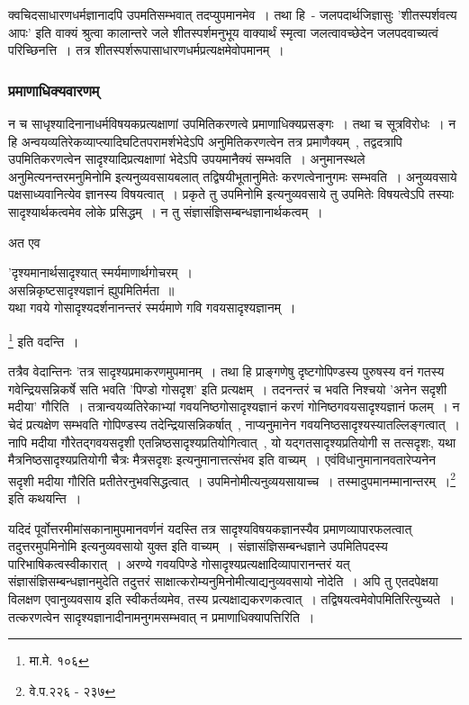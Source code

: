 		क्वचिदसाधारणधर्मज्ञानादपि उपमतिसम्भवात् तदप्युपमानमेव~। तथा हि~- जलपदार्थजिज्ञासुः 'शीतस्पर्शवत्य आपः' इति वाक्यं श्रुत्वा कालान्तरे जले शीतस्पर्शमनुभूय वाक्यार्थं स्मृत्वा जलत्वावच्छेदेन जलपदवाच्यत्वं परिच्छिनत्ति~। तत्र शीतस्पर्शरूपासाधारणधर्मप्रत्यक्षमेवोपमानम्~।

		\subsubsection{प्रमाणाधिक्यवारणम्}

		न च साधृश्यादिनानाधर्मविषयकप्रत्यक्षाणां उपमितिकरणत्वे प्रमाणाधिक्यप्रसङ्गः~। तथा च सूत्रविरोधः~। न हि अन्वयव्यतिरेकव्याप्त्यादिघटितपरामर्शभेदेऽपि अनुमितिकरणत्वेन तत्र प्रमाणैक्यम्~, तद्वदत्रापि उपमितिकरणत्वेन सादृश्यादिप्रत्यक्षाणां भेदेऽपि उपयमानैक्यं सम्भवति~। अनुमानस्थले अनुमित्यनन्तरमनुमिनोमि इत्यनुव्यवसायबलात् तद्विषयीभूतानुमितेः करणत्वेनानुगमः सम्भवति~। अनुव्यवसाये पक्षसाध्यवानित्येव ज्ञानस्य विषयत्वात्~। प्रकृते तु उपमिनोमि इत्यनुव्यवसाये तु उपमितेः विषयत्वेऽपि तस्याः सादृश्यार्थकत्वमेव लोके प्रसिद्धम्~। न तु संज्ञासंज्ञिसम्बन्धज्ञानार्थकत्वम्~। 
		
		अत एव {\fontsize{11.7}{0}\selectfont\s \begin{center}'दृश्यमानार्थसादृश्यात् स्मर्यमाणार्थगोचरम्~।\\ असन्निकृष्टसादृश्यज्ञानं ह्युपमितिर्मता~॥\\ यथा गवये गोसादृश्यदर्शनानन्तरं स्मर्यमाणे गवि गवयसादृश्यज्ञानम्~।\end{center}}\footnote{मा.मे. १०६} इति वदन्ति~। 
		
		तत्रैव वेदान्तिनः {\fontsize{11.7}{0}\selectfont\s 'तत्र सादृश्यप्रमाकरणमुपमानम्~। तथा हि प्राङ्गणेषु दृष्टगोपिण्डस्य पुरुषस्य वनं गतस्य गवेन्द्रियसन्निकर्षे सति भवति 'पिण्डो गोसदृश' इति प्रत्यक्षम्~। तदनन्तरं च भवति निश्चयो 'अनेन सदृशी मदीया' गौरिति~। तत्रान्वयव्यतिरेकाभ्यां गवयनिष्ठगोसादृश्यज्ञानं करणं गोनिष्ठगवयसादृश्यज्ञानं फलम्~। न चेदं प्रत्यक्षेण सम्भवति गोपिण्डस्य तदेन्द्रियासन्निकर्षात्~, नाप्यनुमानेन गवयनिष्ठसादृश्यस्यातल्लिङ्गत्वात्~। नापि मदीया गौरेतद्गवयसदृशी एतन्निष्ठसादृश्यप्रतियोगित्वात्~, यो यद्गतसादृश्यप्रतियोगी स तत्सदृशः, यथा मैत्रनिष्ठसादृश्यप्रतियोगी चैत्रः मैत्रसदृशः इत्यनुमानात्तत्संभव इति वाच्यम्~। एवंविधानुमानानवतारेप्यनेन सदृशी मदीया गौरिति प्रतीतेरनुभवसिद्धत्वात्~। उपमिनोमीत्यनुव्ययसायाच्च~। तस्मादुपमानम्मानान्तरम्~।}\footnote{वे.प.२२६ - २३७} इति कथयन्ति~।
		
		यदिदं पूर्वोत्तरमीमांसकानामुपमानवर्णनं यदस्ति तत्र सादृश्यविषयकज्ञानस्यैव प्रमाणव्यापारफलत्वात् तदुत्तरमुपमिनोमि इत्यनुव्यवसायो युक्त इति वाच्यम्~। संज्ञासंज्ञिसम्बन्धज्ञाने उपमितिपदस्य पारिभाषिकत्वस्वीकारात्~। अरण्ये गवयपिण्डे गोसादृश्यप्रत्यक्षादिव्यापारानन्तरं यत् संज्ञासंज्ञिसम्बन्धज्ञानमुदेति तदुत्तरं साक्षात्करोम्यनुमिनोमीत्याद्यनुव्यवसायो नोदेति~। अपि तु एतदपेक्षया विलक्षण एवानुव्यवसाय इति स्वीकर्तव्यमेव, तस्य प्रत्यक्षाद्यकरणकत्वात्~। तद्विषयत्वमेवोपमितिरित्युच्यते~। तत्करणत्वेन सादृश्यज्ञानादीनामनुगमसम्भवात् न प्रमाणाधिक्यापत्तिरिति~।

